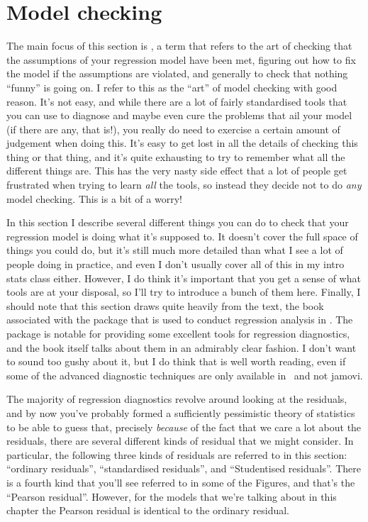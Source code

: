 \section{Model checking~\label{sec:regressiondiagnostics}}

The main focus of this section is , a term that refers to the art of checking that the assumptions of your regression model have been met, figuring out how to fix the model if the assumptions are violated, and generally to check that nothing ``funny'' is going on. I refer to this as the ``art'' of model checking with good reason. It's not easy, and while there are a lot of fairly standardised tools that you can use to diagnose and maybe even cure the problems that ail your model (if there are any, that is!), you really do need to exercise a certain amount of judgement when doing this. It's easy to get lost in all the details of checking this thing or that thing, and it's quite exhausting to try to remember what all the different things are. This has the very nasty side effect that a lot of people get frustrated when trying to learn {\it all} the tools, so instead they decide not to do {\it any} model checking. This is a bit of a worry! 

In this section I describe several different things you can do to check that your regression model is doing what it's supposed to. It doesn't cover the full space of things you could do, but it's still much more detailed than what I see a lot of people doing in practice, and even I don't usually cover all of this in my intro stats class either. However, I do think it's important that you get a sense of what tools are at your disposal, so I'll try to introduce a bunch of them here. Finally, I should note that this section draws quite heavily from the \textcite{Fox2011} text, the book associated with the  package that is used to conduct regression analysis in \R. The  package is notable for providing some excellent tools for regression diagnostics, and the book itself talks about them in an admirably clear fashion. I don't want to sound too gushy about it, but I do think that \textcite{Fox2011} is well worth reading, even if some of the advanced diagnostic techniques are only available in \R\ and not jamovi.


The majority of regression diagnostics revolve around looking at the residuals, and by now you've probably formed a sufficiently pessimistic theory of statistics to be able to guess that, precisely {\it because} of the fact that we care a lot about the residuals, there are several different kinds of  residual that we might consider. In particular, the following three kinds of residuals are referred to in this section: ``ordinary residuals'', ``standardised residuals'', and ``Studentised residuals''. There is a fourth kind that you'll see referred to in some of the Figures, and that's the ``Pearson residual''. However, for the models that we're talking about in this chapter the Pearson residual is identical to the ordinary residual. 

